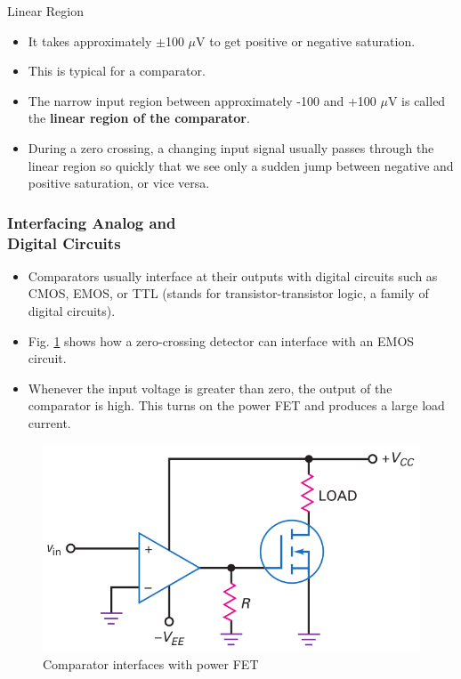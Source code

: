 \documentclass[pdflatex,compress]{beamer}
\begin{document}
\begin{frame}{Linear Region}
	\begin{itemize}
		\item It takes approximately $\pm$100 $\mu$V to get positive or negative saturation.
		\item This is typical for a comparator.
		\item The narrow input region between approximately -100 and +100 $\mu$V is called the \textbf{linear region of the comparator}.
		\item During a zero crossing, a changing input signal usually passes through the linear region so quickly that we see only a sudden jump between negative and positive saturation, or vice versa.
	\end{itemize}
\end{frame}

\begin{frame}
	\frametitle{Interfacing Analog and\\Digital Circuits}
	\begin{itemize}
		\item Comparators usually interface at their outputs with digital circuits such as CMOS, EMOS, or TTL (stands for transistor-transistor logic, a family of digital circuits).
	\end{itemize}
	\begin{multicols}{2}
		\begin{itemize}
			\item Fig. \ref{fig:205a} shows how a zero-crossing detector can interface with an EMOS circuit.
			\item Whenever the input voltage is greater than zero, the output of the comparator is high.
			This turns on the power FET and produces a large load current.
		\end{itemize}
		\begin{figure}
			\centering
			\includegraphics[width=\linewidth]{img/205a}
			\caption{Comparator interfaces with power FET}
			\label{fig:205a}
		\end{figure}
	\end{multicols}
\end{frame}
\end{document}
